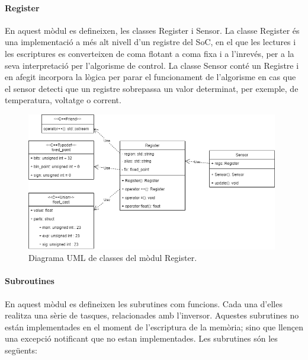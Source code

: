 {{        \paragraph{Register} 
        { 
            En aquest mòdul es defineixen, les classes Register i Sensor. La
            classe Register és una implementació a més alt nivell d'un registre
            del \ac{SoC}, en el que les lectures i les escriptures es
            converteixen de coma flotant a coma fixa i a l'inrevés, per a la
            seva interpretació per l'algorisme de control. La classe Sensor
            conté un Registre i en afegit incorpora la lògica per parar el
            funcionament de l'algorisme en cas que el sensor detecti que un
            registre sobrepassa un valor determinat, per exemple, de
            temperatura, voltatge o corrent.

            \begin{figure}[!htb]
                \centering
                \captionsetup{justification=centering,margin=1cm}
                \includegraphics[width=11cm]
                    { img/4_implementacio/uml_register.png }
                \caption{ Diagrama UML de classes del mòdul Register.
                 }
            \end{figure}
        }

        \paragraph{Subroutines} 
        { 
            En aquest mòdul es defineixen les subrutines com funcions. Cada una
            d'elles realitza una sèrie de tasques, relacionades amb l'inversor.
            Aquestes subrutines no están implementades en el moment de
            l'escriptura de la memòria; sino que llençen una excepció
            notificant que no estan implementades. Les subrutines són les
            següents:

            \begin{itemize}


\end{itemize}}}}
